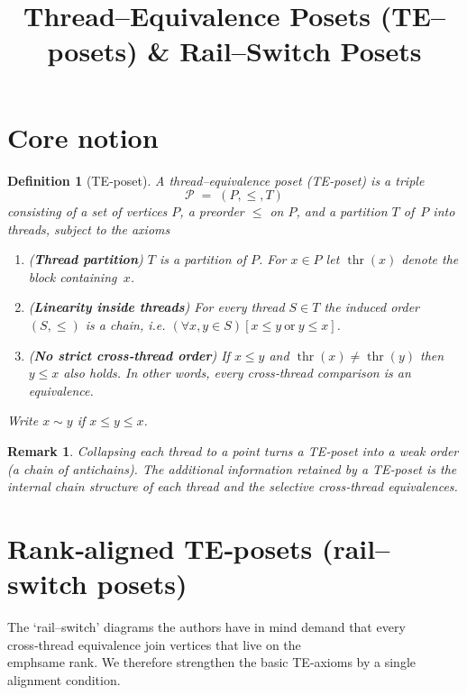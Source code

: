 \documentclass{article}
\title{Thread--Equivalence Posets (TE--posets) \& Rail--Switch Posets}
\author{}
\date{}
\newtheorem{definition}{Definition}
\newtheorem{remark}{Remark}
\begin{document}
\maketitle

\section{Core notion}

\begin{definition}[TE‑poset]\label{def:TE}
A \emph{thread--equivalence poset} (TE‑poset) is a triple
\[
  \mathcal P \;=\;(P,\le,T)
\]
consisting of a set of vertices $P$, a preorder $\le$ on $P$, and a
partition $T$ of~$P$ into \emph{threads}, subject to the axioms
\begin{enumerate}[label=\textbf{T\arabic*}, wide = 0pt]
  \item\label{ax:t1} (\textbf{Thread partition})
        $T$ is a partition of $P$.  For $x\in P$ let
        $\operatorname{thr}(x)$ denote the block containing~$x$.
  \item\label{ax:t2} (\textbf{Linearity inside threads})
        For every thread $S\in T$ the induced order $(S,\le)$ is a chain,
        i.e. $(\forall x,y\in S)[x\le y\ \text{or}\ y\le x]$.
  \item\label{ax:t3} (\textbf{No strict cross‑thread order})
        If $x\le y$ and $\operatorname{thr}(x)\neq\operatorname{thr}(y)$ then
        $y\le x$ also holds.  In other words, \emph{every cross‑thread
        comparison is an equivalence}.
\end{enumerate}
Write $x\sim y$ if $x\le y\le x$.
\end{definition}

\begin{remark}
Collapsing each thread to a point turns a TE‑poset into a
\emph{weak order} (a chain of antichains).  The additional information
retained by a TE‑poset is the internal chain structure of each thread
and the selective cross‑thread equivalences.
\end{remark}

\section{Rank‑aligned TE‑posets (rail--switch posets)}

The `rail--switch' diagrams the authors have in mind demand that every
cross‑thread equivalence join vertices that live on the \\emph{same
rank}.  We therefore strengthen the basic TE‑axioms by a single
alignment condition.
\end{document}
